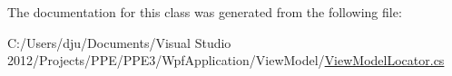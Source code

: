 The documentation for this class was generated from the following file\-:\begin{DoxyCompactItemize}
\item 
C\-:/\-Users/dju/\-Documents/\-Visual Studio 2012/\-Projects/\-P\-P\-E/\-P\-P\-E3/\-Wpf\-Application/\-View\-Model/\hyperlink{_view_model_locator_8cs}{View\-Model\-Locator.\-cs}\end{DoxyCompactItemize}
